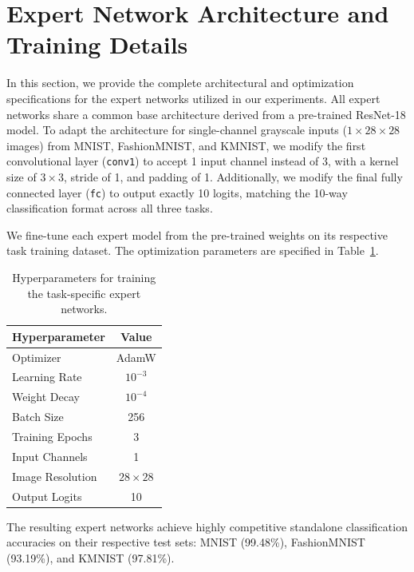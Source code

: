 \documentclass{article}
\theoremstyle{plain}
\theoremstyle{definition}
\theoremstyle{remark}
\begin{document}



\newpage
\appendix
\onecolumn
\section{Expert Network Architecture and Training Details}
\label{appendix:expert_details}
In this section, we provide the complete architectural and optimization specifications for the expert networks utilized in our experiments. 
All expert networks share a common base architecture derived from a pre-trained ResNet-18 model. To adapt the architecture for single-channel grayscale inputs ($1 \times 28 \times 28$ images) from MNIST, FashionMNIST, and KMNIST, we modify the first convolutional layer (\texttt{conv1}) to accept 1 input channel instead of 3, with a kernel size of $3 \times 3$, stride of 1, and padding of 1. Additionally, we modify the final fully connected layer (\texttt{fc}) to output exactly 10 logits, matching the 10-way classification format across all three tasks.

We fine-tune each expert model from the pre-trained weights on its respective task training dataset. The optimization parameters are specified in Table~\ref{tab:expert_hyperparams}.
\begin{table}[h]
\caption{Hyperparameters for training the task-specific expert networks.}
\label{tab:expert_hyperparams}
\vskip 0.15in
\begin{center}
\begin{small}
\begin{tabular}{lc}
\toprule
Hyperparameter & Value \\
\midrule
Optimizer & AdamW \\
Learning Rate & $10^{-3}$ \\
Weight Decay & $10^{-4}$ \\
Batch Size & 256 \\
Training Epochs & 3 \\
Input Channels & 1 \\
Image Resolution & $28 \times 28$ \\
Output Logits & 10 \\
\bottomrule
\end{tabular}
\end{small}
\end{center}
\vskip -0.1in
\end{table}

The resulting expert networks achieve highly competitive standalone classification accuracies on their respective test sets: MNIST (99.48\%), FashionMNIST (93.19\%), and KMNIST (97.81\%).
\end{document}
